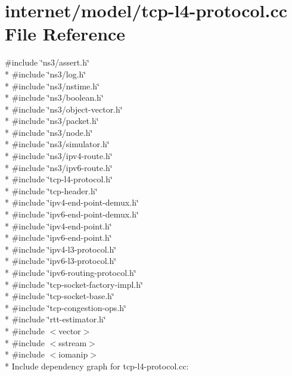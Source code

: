 \hypertarget{tcp-l4-protocol_8cc}{}\section{internet/model/tcp-\/l4-\/protocol.cc File Reference}
\label{tcp-l4-protocol_8cc}
{\ttfamily \#include \char`\"{}ns3/assert.\+h\char`\"{}}\\*
{\ttfamily \#include \char`\"{}ns3/log.\+h\char`\"{}}\\*
{\ttfamily \#include \char`\"{}ns3/nstime.\+h\char`\"{}}\\*
{\ttfamily \#include \char`\"{}ns3/boolean.\+h\char`\"{}}\\*
{\ttfamily \#include \char`\"{}ns3/object-\/vector.\+h\char`\"{}}\\*
{\ttfamily \#include \char`\"{}ns3/packet.\+h\char`\"{}}\\*
{\ttfamily \#include \char`\"{}ns3/node.\+h\char`\"{}}\\*
{\ttfamily \#include \char`\"{}ns3/simulator.\+h\char`\"{}}\\*
{\ttfamily \#include \char`\"{}ns3/ipv4-\/route.\+h\char`\"{}}\\*
{\ttfamily \#include \char`\"{}ns3/ipv6-\/route.\+h\char`\"{}}\\*
{\ttfamily \#include \char`\"{}tcp-\/l4-\/protocol.\+h\char`\"{}}\\*
{\ttfamily \#include \char`\"{}tcp-\/header.\+h\char`\"{}}\\*
{\ttfamily \#include \char`\"{}ipv4-\/end-\/point-\/demux.\+h\char`\"{}}\\*
{\ttfamily \#include \char`\"{}ipv6-\/end-\/point-\/demux.\+h\char`\"{}}\\*
{\ttfamily \#include \char`\"{}ipv4-\/end-\/point.\+h\char`\"{}}\\*
{\ttfamily \#include \char`\"{}ipv6-\/end-\/point.\+h\char`\"{}}\\*
{\ttfamily \#include \char`\"{}ipv4-\/l3-\/protocol.\+h\char`\"{}}\\*
{\ttfamily \#include \char`\"{}ipv6-\/l3-\/protocol.\+h\char`\"{}}\\*
{\ttfamily \#include \char`\"{}ipv6-\/routing-\/protocol.\+h\char`\"{}}\\*
{\ttfamily \#include \char`\"{}tcp-\/socket-\/factory-\/impl.\+h\char`\"{}}\\*
{\ttfamily \#include \char`\"{}tcp-\/socket-\/base.\+h\char`\"{}}\\*
{\ttfamily \#include \char`\"{}tcp-\/congestion-\/ops.\+h\char`\"{}}\\*
{\ttfamily \#include \char`\"{}rtt-\/estimator.\+h\char`\"{}}\\*
{\ttfamily \#include $<$vector$>$}\\*
{\ttfamily \#include $<$sstream$>$}\\*
{\ttfamily \#include $<$iomanip$>$}\\*
Include dependency graph for tcp-\/l4-\/protocol.cc\+:
